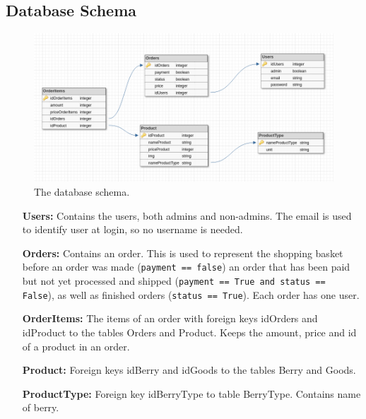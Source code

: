 \newpage

\subsection{Database Schema}

\begin{figure}[H]
  \centering
  \includegraphics[width=\textwidth]{second_sprint/db_schema.png}
  \caption{\label{fig:schema} The database schema.}
\end{figure}

\begin{itemize}
  \item[\textbf{Users:}] Contains the users, both admins and non-admins. The
    email is used to identify user at login, so no username is needed.
  \item[\textbf{Orders:}] Contains an order. This is used to represent
    the shopping basket before an order was made (\texttt{payment
    == false}) an order that has been paid but not yet processed and shipped
    (\texttt{payment == True and status == False}), as well as
    finished orders (\texttt{status == True}). Each order has
    one user.
  \item[\textbf{OrderItems:}] The items of an order with foreign keys
    idOrders and idProduct to the tables Orders and Product.  Keeps the
    amount, price and id of a product in an order.
  \item[\textbf{Product:}] Foreign keys idBerry and idGoods to the tables
    Berry and Goods.
  \item[\textbf{ProductType:}] Foreign key idBerryType to table BerryType. Contains
    name of berry.
\end{itemize}
